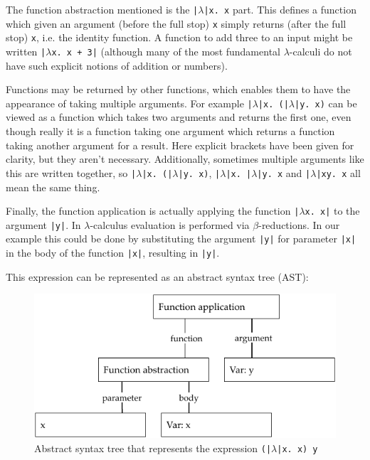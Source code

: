 \documentclass[a4paper,fleqn,oneside,12pt]{report}
\begin{document}
The function abstraction mentioned is the \texttt{|$\lambda$|x. x} part. This defines a function which given an argument (before the full stop) \texttt{x} simply returns (after the full stop) \texttt{x}, i.e. the identity function. A function to add three to an input might be written \texttt{|$\lambda$x. x + 3|} (although many of the most fundamental $\lambda$-calculi do not have such explicit notions of addition or numbers).

Functions may be returned by other functions, which enables them to have the appearance of taking multiple arguments. For example \texttt{|$\lambda$|x. (|$\lambda$|y. x)} can be viewed as a function which takes two arguments and returns the first one, even though really it is a function taking one argument which returns a function taking another argument for a result. Here explicit brackets have been given for clarity, but they aren’t necessary. Additionally, sometimes multiple arguments like this are written together, so \texttt{|$\lambda$|x. (|$\lambda$|y. x)}, \texttt{|$\lambda$|x. |$\lambda$|y. x} and \texttt{|$\lambda$|xy. x} all mean the same thing.

Finally, the function application is actually applying the function \texttt{|$\lambda$x. x|} to the argument \texttt{|y|}. In $\lambda$-calculus evaluation is performed via $\beta$-reductions. In our example this could be done by substituting the argument \texttt{|y|} for parameter \texttt{|x|} in the body of the function \texttt{|x|}, resulting in \texttt{|y|}.

This expression can be represented as an abstract syntax tree (AST):

{\centering \begin{figure}[h!]
  \centering
  \includegraphics[width=0.8\linewidth]{images/ast_abs_id_y.pdf}
  \caption{Abstract syntax tree that represents the expression \texttt{(|$\lambda$|x. x) y}}
\end{figure} \par}
\end{document}
